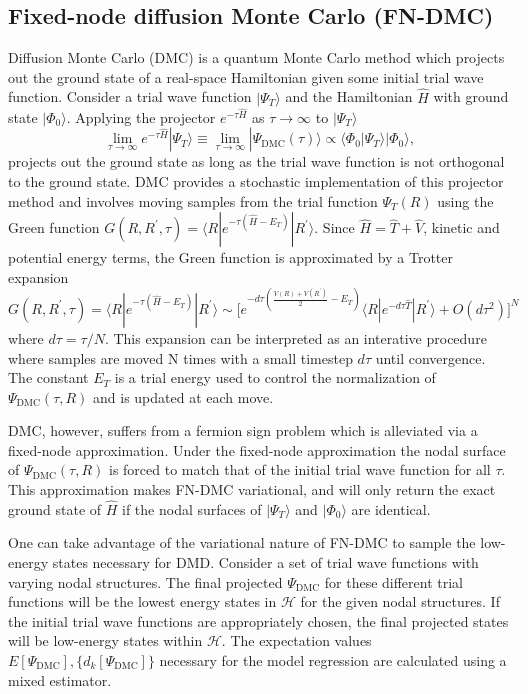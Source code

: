 \documentclass[12pt]{article}
\begin{document}
\subsection{Fixed-node diffusion Monte Carlo (FN-DMC)}
Diffusion Monte Carlo (DMC) is a quantum Monte Carlo method which projects out the ground state of a real-space Hamiltonian given some initial trial wave function.
Consider a trial wave function $|\Psi_T\rangle$ and the Hamiltonian $\hat{H}$ with ground state $|\Phi_0\rangle$. 
Applying the projector $e^{-\tau \hat{H}}$ as $\tau \rightarrow \infty$ to $|\Psi_T \rangle$
\begin{equation}
\lim_{\tau \rightarrow \infty} e^{-\tau \hat{H}} |\Psi_T\rangle 
\equiv \lim_{\tau \rightarrow \infty} |\Psi_\text{DMC}(\tau)\rangle \propto \langle \Phi_0|\Psi_T\rangle |\Phi_0\rangle,
\end{equation}
projects out the ground state as long as the trial wave function is not orthogonal to the ground state. 
DMC provides a stochastic implementation of this projector method and involves moving samples from the trial function $\Psi_T(R)$ using the Green function $G(R, R^\prime, \tau) = \langle R | e^{-\tau(\hat{H} - E_T)} | R^\prime \rangle$. 
Since $\hat{H} = \hat{T} + \hat{V}$, kinetic and potential energy terms, the Green function is approximated by a Trotter expansion 
$$G(R, R^\prime, \tau) = \langle R | e^{-\tau(\hat{H} - E_T)} | R^\prime \rangle \sim \Big[e^{-d\tau(\frac{V(R) + V(R^\prime)}{2} - E_T)} \langle R| e^{-d\tau\hat{T}}|R^\prime \rangle + O(d\tau^2) \Big]^N $$ 
where $d\tau = \tau/N$.
This expansion can be interpreted as an interative procedure where samples are moved N times with a small timestep $d\tau$ until convergence.
The constant $E_T$ is a trial energy used to control the normalization of $\Psi_\text{DMC}(\tau, R)$ and is updated at each move.

DMC, however, suffers from a fermion sign problem which is alleviated via a fixed-node approximation.
Under the fixed-node approximation the nodal surface of $\Psi_\text{DMC}(\tau, R)$ is forced to match that of the initial trial wave function for all $\tau$.
This approximation makes FN-DMC variational, and will only return the exact ground state of $\hat{H}$ if the nodal surfaces of $|\Psi_T\rangle$ and $|\Phi_0\rangle$ are identical.

One can take advantage of the variational nature of FN-DMC to sample the low-energy states necessary for DMD.
Consider a set of trial wave functions with varying nodal structures.
The final projected $\Psi_\text{DMC}$ for these different trial functions will be the lowest energy states in $\mathcal{H}$ for the given nodal structures.
If the initial trial wave functions are appropriately chosen, the final projected states will be low-energy states within $\mathcal{H}$.
The expectation values $E[\Psi_\text{DMC}], \{d_k[\Psi_\text{DMC}]\}$ necessary for the model regression are calculated using a mixed estimator.
\end{document}
